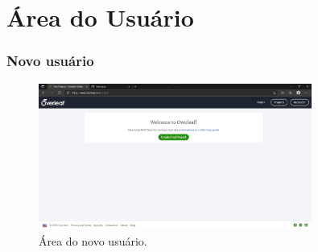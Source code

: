 \documentclass{beamer}
\begin{document}
    \section{Área do Usuário}
    \begin{frame}
        \frametitle{Novo usuário}
    \begin{figure}
        \centering
        \caption{Área do novo usuário.}
        \label{fig:newUserOverleaf}
        \includegraphics[width=0.8\textwidth]{../images/newUserOverleaf.png}
    \end{figure}
    \end{frame}
\end{document}
